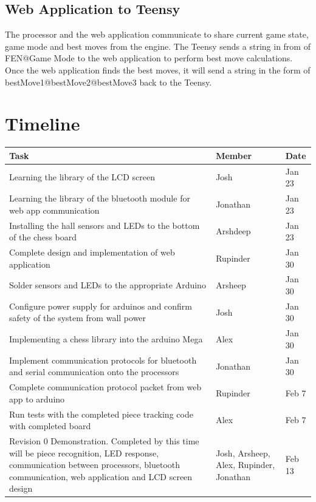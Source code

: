 \documentclass[12pt, titlepage]{article}
\begin{document}
\subsection{Web Application to Teensy}
The processor and the web application communicate to share current game state, game mode and 
best moves from the engine. The Teensy sends a string in from of FEN@Game Mode to the web application
to perform best move calculations. Once the web application finds the best moves, it will send a
string in the form of bestMove1@bestMove2@bestMove3 back to the Teensy.

\section{Timeline}
\begin{table}[H]
  \centering
      \setlength{\leftmargini}{0.4cm}
      \begin{tabular}{| >{\centering\arraybackslash}m{10cm} | 
        >{\centering\arraybackslash}m{2cm} | 
        >{\centering\arraybackslash}m{1.5cm} |}
      \hline
      \rowcolor[gray]{0.9}
      Task & Member & Date\\
      \hline 
      Learning the library of the LCD screen & Josh & Jan 23\\
      \hline
      Learning the library of the bluetooth module for web app communication & Jonathan & Jan 23\\
      \hline 
      Installing the hall sensors and LEDs to the bottom of the chess board & Arshdeep & Jan 23\\
      \hline
      Complete design and implementation of web application & Rupinder & Jan 30\\
      \hline 
      Solder sensors and LEDs to the appropriate Arduino & Arsheep & Jan 30\\
      \hline 
      Configure power supply for arduinos and confirm safety of the system from wall power & Josh & Jan 30\\
      \hline
      Implementing a chess library into the arduino Mega & Alex & Jan 30\\
      \hline 
      Implement communication protocols for bluetooth and serial communication onto the processors & Jonathan
      & Jan 30\\
      \hline 
      Complete communication protocol packet from web app to arduino & Rupinder & Feb 7\\
      \hline 
      Run tests with the completed piece tracking code with completed board & Alex & Feb 7\\
      \hline 
      Revision 0 Demonstration. Completed by this time will be piece recognition, LED response, communication 
      between processors, bluetooth communication, web application and LCD screen design
      & Josh, Arsheep, Alex, Rupinder, Jonathan & Feb 13\\
      \hline
      
      \end{tabular}
  \label{Table}
  \end{table}
\end{document}
